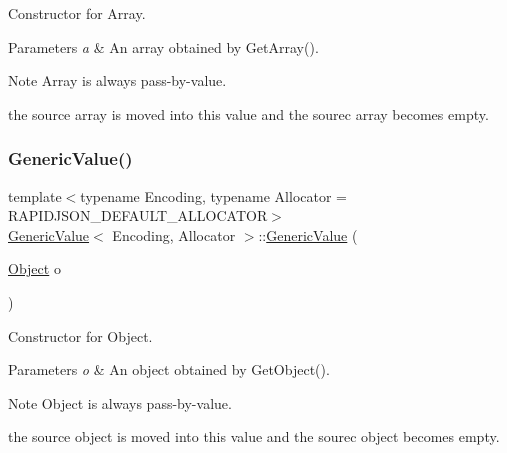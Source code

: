 Constructor for Array. 


\begin{DoxyParams}{Parameters}
{\em a} & An array obtained by {\ttfamily Get\+Array()}. \\
\hline
\end{DoxyParams}
\begin{DoxyNote}{Note}
{\ttfamily Array} is always pass-\/by-\/value. 

the source array is moved into this value and the sourec array becomes empty. 
\end{DoxyNote}
\mbox{\label{classGenericValue_a9c294e56f4ab940f845f7c171b183483}} 
\subsubsection{\texorpdfstring{Generic\+Value()}{GenericValue()}\hspace{0.1cm}{\footnotesize\ttfamily [17/17]}}
{\footnotesize\ttfamily template$<$typename Encoding, typename Allocator = R\+A\+P\+I\+D\+J\+S\+O\+N\+\_\+\+D\+E\+F\+A\+U\+L\+T\+\_\+\+A\+L\+L\+O\+C\+A\+T\+OR$>$ \\
\hyperlink{classGenericValue}{Generic\+Value}$<$ Encoding, Allocator $>$\+::\hyperlink{classGenericValue}{Generic\+Value} (\begin{DoxyParamCaption}\item[{\hyperlink{classGenericValue_aee3606d69d411ce0d98f29639585989b}{Object}}]{o }\end{DoxyParamCaption})\hspace{0.3cm}{\ttfamily [inline]}}



Constructor for Object. 


\begin{DoxyParams}{Parameters}
{\em o} & An object obtained by {\ttfamily Get\+Object()}. \\
\hline
\end{DoxyParams}
\begin{DoxyNote}{Note}
{\ttfamily Object} is always pass-\/by-\/value. 

the source object is moved into this value and the sourec object becomes empty. 
\end{DoxyNote}
\mbox{\label{classGenericValue_a213ba89ef5ef961a5e655bd8c78ac9f4}} 
